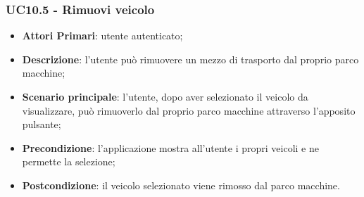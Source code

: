 \subsubsection{UC10.5 - Rimuovi veicolo}
\begin{itemize}
	\item \textbf{Attori Primari}: utente autenticato;
	\item \textbf{Descrizione}: l'utente può rimuovere un mezzo di trasporto dal proprio parco macchine;
	\item \textbf{Scenario principale}: l'utente, dopo aver selezionato il veicolo da visualizzare, può rimuoverlo dal proprio parco macchine attraverso l'apposito pulsante;
	\item \textbf{Precondizione}: l'applicazione mostra all'utente i propri veicoli e ne permette la selezione;
	\item \textbf{Postcondizione}: il veicolo selezionato viene rimosso dal parco macchine.
\end{itemize}
